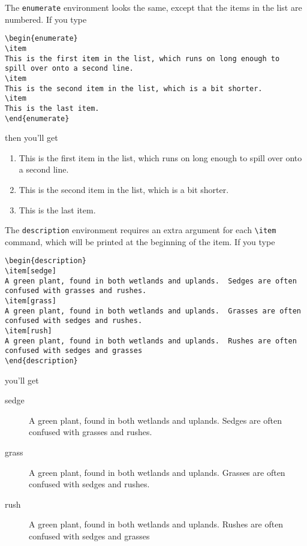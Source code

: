 The {\tt enumerate} environment looks the same, except that the items
in the list are numbered.  If you type
\begin{verbatim}
\begin{enumerate}
\item
This is the first item in the list, which runs on long enough to
spill over onto a second line.
\item
This is the second item in the list, which is a bit shorter.
\item
This is the last item.
\end{enumerate}
\end{verbatim}
then you'll get
\begin{enumerate}
\item
This is the first item in the list, which runs on long enough to
spill over onto a second line.
\item
This is the second item in the list, which is a bit shorter.
\item
This is the last item.
\end{enumerate}

The {\tt description} environment requires an extra argument for each
\verb"\item" command, which will be printed at the beginning of the
item.  If you type
\begin{verbatim}
\begin{description}
\item[sedge]
A green plant, found in both wetlands and uplands.  Sedges are often
confused with grasses and rushes.
\item[grass]
A green plant, found in both wetlands and uplands.  Grasses are often
confused with sedges and rushes.
\item[rush]
A green plant, found in both wetlands and uplands.  Rushes are often
confused with sedges and grasses
\end{description}
\end{verbatim}
you'll get
\begin{description}
\item[sedge]
A green plant, found in both wetlands and uplands.  Sedges are often
confused with grasses and rushes.
\item[grass]
A green plant, found in both wetlands and uplands.  Grasses are often
confused with sedges and rushes.
\item[rush]
A green plant, found in both wetlands and uplands.  Rushes are often
confused with sedges and grasses
\end{description}


